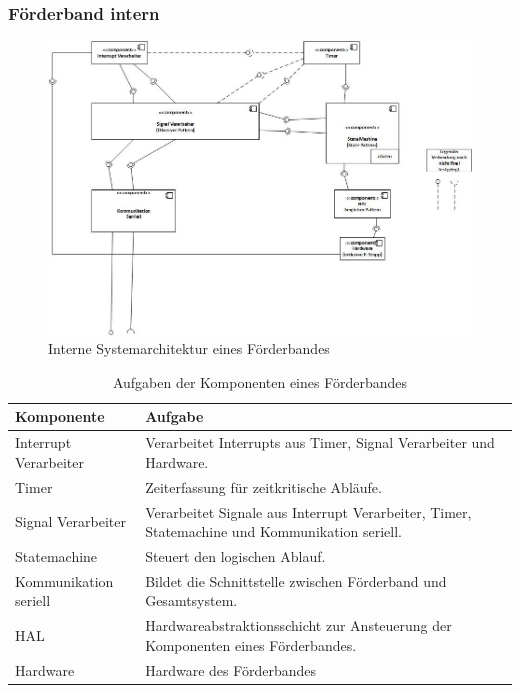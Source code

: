 \documentclass[a4paper, 11pt]{article}
\begin{document}
\subsubsection{Förderband intern}

\begin{figure}[h]
\centering 
\includegraphics[scale=0.7]{images/SW_Architektur/Foerderband.jpg}
\caption{Interne Systemarchitektur eines Förderbandes}
\label{archintern}
\end{figure}

\begin{table}[h]
\center
\begin{tabularx}{\textwidth}{|l|X|}
\hline
\textbf{Komponente}&\textbf{Aufgabe}\\
\hline
Interrupt Verarbeiter&Verarbeitet Interrupts aus Timer, Signal Verarbeiter und Hardware.\\
\hline
Timer&Zeiterfassung für zeitkritische Abläufe.\\
\hline
Signal Verarbeiter&Verarbeitet Signale aus Interrupt Verarbeiter, Timer, Statemachine und Kommunikation seriell.\\
\hline
Statemachine&Steuert den logischen Ablauf.\\
\hline
Kommunikation seriell&Bildet die Schnittstelle zwischen Förderband und Gesamtsystem.\\
\hline
HAL&Hardwareabstraktionsschicht zur Ansteuerung der Komponenten eines Förderbandes.\\
\hline
Hardware&Hardware des Förderbandes\\
\hline
\end{tabularx}
\caption{Aufgaben der Komponenten eines Förderbandes}
\label{archinterntcomp}
\end{table}
\end{document}

